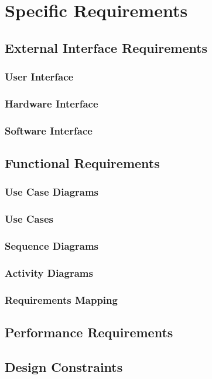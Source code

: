 \chapter{Specific Requirements}

\section{External Interface Requirements}
\subsection{User Interface}
\subsection{Hardware Interface}
\subsection{Software Interface}

\section{Functional Requirements}
\subsection{Use Case Diagrams}
\subsection{Use Cases}
\subsection{Sequence Diagrams}
\subsection{Activity Diagrams}
\subsection{Requirements Mapping}

\section{Performance Requirements}

\section{Design Constraints}
